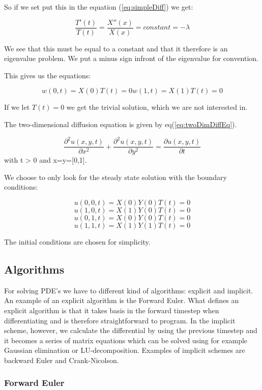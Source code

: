 \documentclass[a4paper,10pt]{article}
\begin{document}
So if we set put this in the equation (\ref{eq:simpleDiff}) we get:

\begin{equation}
\frac{T'(t)}{T(t)} = \frac{X''(x)}{X(x)} = constant = -\lambda
\label{eq:eigValue}
\end{equation}

We see that this must be equal to a constant and that it therefore is an eigenvalue problem. We put a minus sign infront of the eigenvalue for convention.

This gives us the equations:

\begin{equation}
w(0,t) = X(0)T(t) = 0 
w(1,t) = X(1)T(t) = 0
\label{eq:initialCond}
\end{equation}

If we let $T(t) = 0$ we get the trivial solution, which we are not interested in.

The two-dimensional diffusion equation is given by eq(\ref{eq:twoDimDiffEq}).

\begin{equation}
  \frac{\partial^2 u(x,y,t)}{\partial x^2} + \frac{\partial^2 u(x,y,t)}{\partial y^2} = \frac{\partial u(x,y,t)}{\partial t}
\label{eq:twoDimDiffEq}
\end{equation}
with t > 0 and x=y=[0,1].

We choose to only look for the steady state solution with the boundary conditions:

\[ u(0,0,t) = X(0)Y(0)T(t) = 0 \]
\[ u(1,0,t) = X(1)Y(0)T(t) = 0 \]
\[ u(0,1,t) = X(0)Y(0)T(t) = 0 \]
\[ u(1,1,t) = X(1)Y(1)T(t) = 0 \]

The initial conditions are chosen for simplicity.

\subsection{Algorithms}
For solving PDE's we have to different kind of algorithms: explicit and implicit. An example of an explicit algorithm is the Forward Euler.
What defines an explicit algorithm is that it takes basis in the forward timestep when differentiating and is therefore straightforward to program.
In the implicit scheme, however, we calculate the differential by using the previous timestep and it becomes a series of matrix equations which can be solved 
using for example Gaussian elimination or LU-decomposition. Examples of implicit schemes are backward Euler and Crank-Nicolson.

\subsubsection{Forward Euler}
\end{document}
